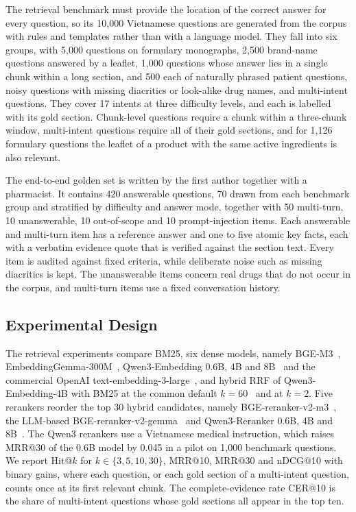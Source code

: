 The retrieval benchmark must provide the location of the correct answer for every question, so its 10{,}000 Vietnamese questions are generated from the corpus with rules and templates rather than with a language model. They fall into six groups, with 5{,}000 questions on formulary monographs, 2{,}500 brand-name questions answered by a leaflet, 1{,}000 questions whose answer lies in a single chunk within a long section, and 500 each of naturally phrased patient questions, noisy questions with missing diacritics or look-alike drug names, and multi-intent questions. They cover 17 intents at three difficulty levels, and each is labelled with its gold section. Chunk-level questions require a chunk within a three-chunk window, multi-intent questions require all of their gold sections, and for 1{,}126 formulary questions the leaflet of a product with the same active ingredients is also relevant.

The end-to-end golden set is written by the first author together with a pharmacist. It contains 420 answerable questions, 70 drawn from each benchmark group and stratified by difficulty and answer mode, together with 50 multi-turn, 10 unanswerable, 10 out-of-scope and 10 prompt-injection items. Each answerable and multi-turn item has a reference answer and one to five atomic key facts, each with a verbatim evidence quote that is verified against the section text. Every item is audited against fixed criteria, while deliberate noise such as missing diacritics is kept. The unanswerable items concern real drugs that do not occur in the corpus, and multi-turn items use a fixed conversation history.

\subsection{Experimental Design}\label{sec:design}

The retrieval experiments compare BM25, six dense models, namely BGE-M3~\cite{chen2024bgem3}, EmbeddingGemma-300M~\cite{vera2025embeddinggemma}, Qwen3-Embedding 0.6B, 4B and 8B~\cite{zhang2025qwen3emb} and the commercial OpenAI text-embedding-3-large~\cite{openai2024embeddings}, and hybrid RRF of Qwen3-Embedding-4B with BM25 at the common default $k=60$~\cite{cormack2009rrf} and at $k=2$. Five rerankers reorder the top 30 hybrid candidates, namely BGE-reranker-v2-m3~\cite{chen2024bgem3}, the LLM-based BGE-reranker-v2-gemma~\cite{li2024llama2vec} and Qwen3-Reranker 0.6B, 4B and 8B~\cite{zhang2025qwen3emb}. The Qwen3 rerankers use a Vietnamese medical instruction, which raises MRR@30 of the 0.6B model by 0.045 in a pilot on 1{,}000 benchmark questions. We report Hit@$k$ for $k\in\{3,5,10,30\}$, MRR@10, MRR@30 and nDCG@10 with binary gains, where each question, or each gold section of a multi-intent question, counts once at its first relevant chunk. The complete-evidence rate CER@10 is the share of multi-intent questions whose gold sections all appear in the top ten.

